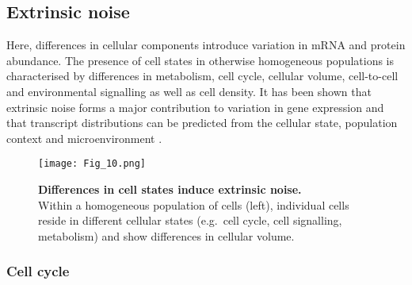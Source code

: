 
\newpage

\subsection{Extrinsic noise}

Here, differences in cellular components introduce variation in mRNA and protein abundance. 
The presence of cell states in otherwise homogeneous populations is characterised by differences in metabolism, cell cycle, cellular volume, cell-to-cell and environmental signalling as well as cell density. 
It has been shown that extrinsic noise forms a major contribution to variation in gene expression and that transcript distributions can be predicted from the cellular state, population context and microenvironment \citep{Battich2015a}.

\begin{figure}[!h]
\centering
\texttt{[image: Fig\_10.png]}
\caption[Differences in cell states induce extrinsic noise]{\textbf{Differences in cell states induce extrinsic noise.}\\
Within a homogeneous population of cells (left), individual cells reside in different cellular states (e.g.~cell cycle, cell signalling, metabolism) and show differences in cellular volume.}
\label{fig0:extrinsic}
\end{figure} 

\subsubsection{Cell cycle}

